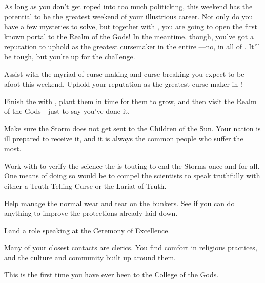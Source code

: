 \documentclass[char]{GL2020}
\begin{document}
As long as you don't get roped into too much politicking, this weekend has the potential to be the greatest weekend of your illustrious career. Not only do you have a few mysteries to solve, but together with \cFlowPriest{}, you are going to open the first known portal to the Realm of the Gods! In the meantime, though, you've got a reputation to uphold as the greatest cursemaker in the entire \pFarm{}---no, in all of \pEarth{}. It'll be tough, but you're up for the challenge.

\begin{itemz}
	\item Assist with the myriad of curse making and curse breaking you expect to be afoot this weekend. Uphold your reputation as the greatest curse maker in \pEarth{}!
	\item Finish the \iBeansNB{} with \cFlowPriest{}, plant them in time for them to grow, and then visit the Realm of the Gods---just to say you've done it.
	\item Make sure the Storm does not get sent to the Children of the Sun. Your nation is ill prepared to receive it, and it is always the common people who suffer the most.
	\item Work with \cHedonist{} to verify the science the \pTech{} is touting to end the Storms once and for all. One means of doing so would be to compel the scientists to speak truthfully with either a Truth-Telling Curse or the Lariat of Truth.
	\item Help \cBunker{} manage the normal wear and tear on the bunkers. See if you can do anything to improve the protections already laid down.
	\item Land a role speaking at the Ceremony of Excellence.
\end{itemz}

\begin{itemz}[Notes]
	\item Many of your closest contacts are clerics. You find comfort in religious practices, and the culture and community built up around them.
	\item This is the first time you have ever been to the College of the Gods.
\end{itemz}
\end{document}
